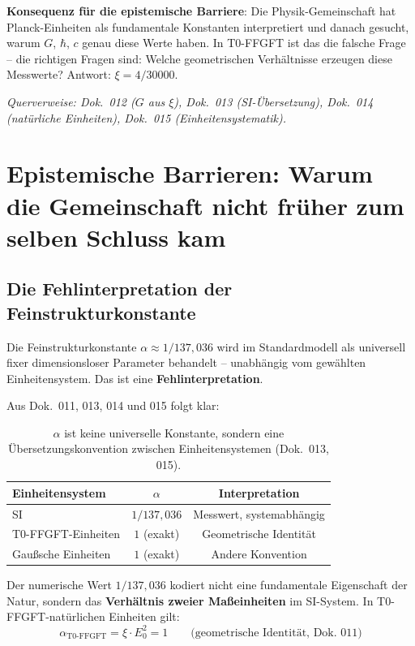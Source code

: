 \textbf{Konsequenz für die epistemische Barriere}:
Die Physik-Gemeinschaft hat Planck-Einheiten als fundamentale
Konstanten interpretiert und danach gesucht, warum $G$, $\hbar$,
$c$ genau diese Werte haben. In T0-FFGFT ist das die falsche Frage --
die richtigen Fragen sind: Welche geometrischen Verhältnisse
erzeugen diese Messwerte? Antwort: $\xi = 4/30000$.

\noindent\textit{Querverweise: Dok.~012 ($G$ aus $\xi$),
Dok.~013 (SI-Übersetzung), Dok.~014 (natürliche Einheiten),
Dok.~015 (Einheitensystematik).}

\section{Epistemische Barrieren: Warum die Gemeinschaft nicht früher zum selben Schluss kam}

\subsection{Die Fehlinterpretation der Feinstrukturkonstante}

Die Feinstrukturkonstante $\alpha \approx 1/137{,}036$ wird im
Standardmodell als universell fixer dimensionsloser Parameter
behandelt -- unabhängig vom gewählten Einheitensystem. Das ist
eine \textbf{Fehlinterpretation}.

Aus Dok.~011, 013, 014 und 015 folgt klar:

\begin{table}[htbp]
\centering
\begin{tabular}{lcc}
\toprule
\textbf{Einheitensystem} & $\alpha$ & \textbf{Interpretation} \\
\midrule
SI                        & $1/137{,}036$ & Messwert, systemabhängig \\
T0-FFGFT-Einheiten   & $1$ (exakt)   & Geometrische Identität \\
Gaußsche Einheiten        & $1$ (exakt)   & Andere Konvention \\
\bottomrule
\end{tabular}
\caption{$\alpha$ ist keine universelle Konstante, sondern eine
Übersetzungskonvention zwischen Einheitensystemen (Dok.~013, 015).}
\label{tab:alpha_einheiten}
\end{table}

Der numerische Wert $1/137{,}036$ kodiert nicht eine fundamentale
Eigenschaft der Natur, sondern das \textbf{Verhältnis zweier
Maßeinheiten} im SI-System. In T0-FFGFT-natürlichen Einheiten gilt:
\begin{equation}
    \alpha_{\text{T0-FFGFT}} = \xi \cdot E_0^2 = 1
    \qquad \text{(geometrische Identität, Dok.~011)}
\end{equation}

